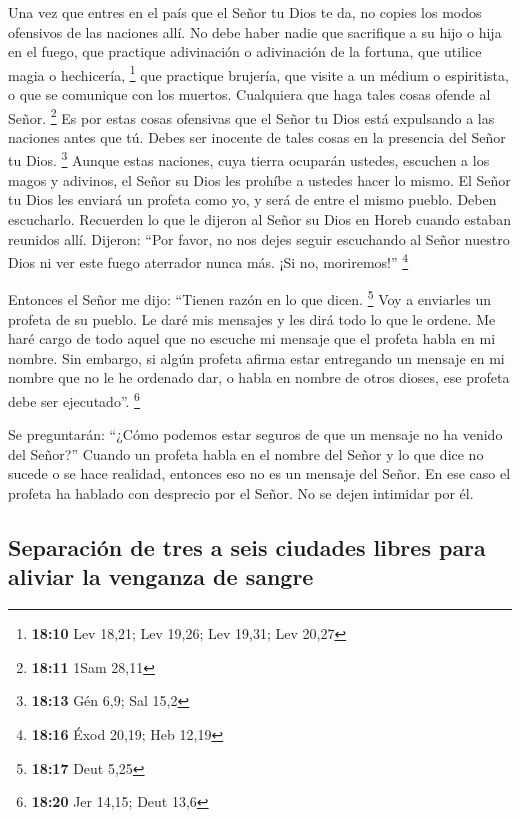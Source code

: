 Una vez que entres en el país que el Señor tu Dios te da,
no copies los modos ofensivos de las naciones allí.  No
debe haber nadie que sacrifique a su hijo o hija en el fuego, que
practique adivinación o adivinación de la fortuna, que utilice magia o
hechicería, \footnote{\textbf{18:10} Lev 18,21; Lev 19,26; Lev 19,31;
  Lev 20,27}  que practique brujería, que visite a un
médium o espiritista, o que se comunique con los muertos. Cualquiera que
haga tales cosas ofende al Señor. \footnote{\textbf{18:11} 1Sam 28,11}
 Es por estas cosas ofensivas que el Señor tu Dios está
expulsando a las naciones antes que tú.  Debes ser
inocente de tales cosas en la presencia del Señor tu Dios. \footnote{\textbf{18:13}
  Gén 6,9; Sal 15,2}  Aunque estas naciones, cuya tierra
ocuparán ustedes, escuchen a los magos y adivinos, el Señor su Dios les
prohíbe a ustedes hacer lo mismo.  El Señor tu Dios les
enviará un profeta como yo, y será de entre el mismo pueblo. Deben
escucharlo.  Recuerden lo que le dijeron al Señor su Dios
en Horeb cuando estaban reunidos allí. Dijeron: ``Por favor, no nos
dejes seguir escuchando al Señor nuestro Dios ni ver este fuego
aterrador nunca más. ¡Si no, moriremos!'' \footnote{\textbf{18:16} Éxod
  20,19; Heb 12,19}

 Entonces el Señor me dijo: ``Tienen razón en lo que
dicen. \footnote{\textbf{18:17} Deut 5,25}  Voy a
enviarles un profeta de su pueblo. Le daré mis mensajes y les dirá todo
lo que le ordene.  Me haré cargo de todo aquel que no
escuche mi mensaje que el profeta habla en mi nombre. 
Sin embargo, si algún profeta afirma estar entregando un mensaje en mi
nombre que no le he ordenado dar, o habla en nombre de otros dioses, ese
profeta debe ser ejecutado''. \footnote{\textbf{18:20} Jer 14,15; Deut
  13,6}

 Se preguntarán: ``¿Cómo podemos estar seguros de que un
mensaje no ha venido del Señor?''  Cuando un profeta
habla en el nombre del Señor y lo que dice no sucede o se hace realidad,
entonces eso no es un mensaje del Señor. En ese caso el profeta ha
hablado con desprecio por el Señor. No se dejen intimidar por él.

\hypertarget{separaciuxf3n-de-tres-a-seis-ciudades-libres-para-aliviar-la-venganza-de-sangre}{%
\subsection{Separación de tres a seis ciudades libres para aliviar la
venganza de
sangre}\label{separaciuxf3n-de-tres-a-seis-ciudades-libres-para-aliviar-la-venganza-de-sangre}}

